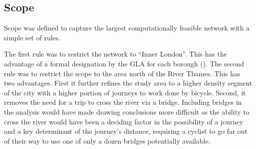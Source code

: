 


\subsection{Scope}


Scope was defined to capture the largest computationally feasible network with a simple set of rules. 

The first rule was to restrict the network to ``Inner London''. This has the advantage of a formal designation by the GLA for each borough (\cite{innerlondon}). The second rule was to restrict the scope to the area north of the River Thames. This has two advantages. First it further refines the study area to a higher density segment of the city with a higher portion of journeys to work done by bicycle. Second, it removes the need for a trip to cross the river via a bridge. Including bridges in the analysis would have made drawing conclusions more difficult as the ability to cross the river would have been a deciding factor in the possibility of a journey and a key determinant of the journey's distance, requiring a cyclist to go far out of their way to use one of only a dozen bridges potentially available. 

